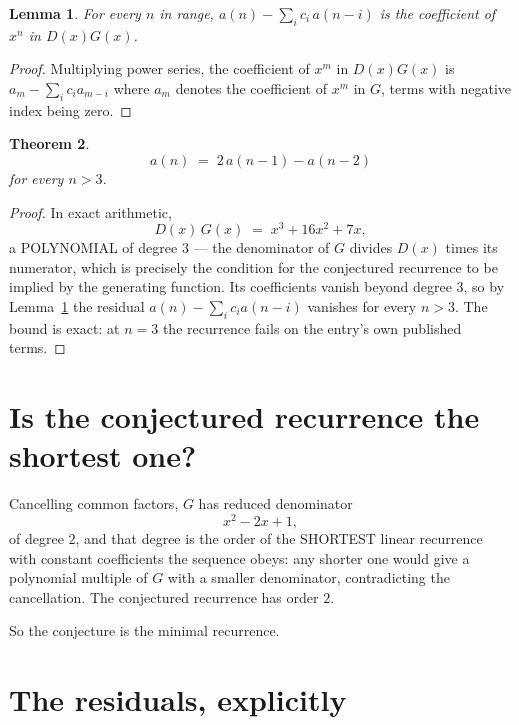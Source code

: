 \documentclass[11pt,a4paper]{article}
\theoremstyle{plain}
\newtheorem{theorem}{Theorem}
\newtheorem{lemma}[theorem]{Lemma}
\theoremstyle{definition}
\begin{document}
\begin{lemma}\label{lem:key}
For every $n$ in range, $a(n)-\sum_i c_i\,a(n-i)$ is the coefficient of $x^{n}$ in
$D(x)G(x)$.
\end{lemma}

\begin{proof}
Multiplying power series, the coefficient of $x^{m}$ in $D(x)G(x)$ is
$a_m-\sum_i c_i a_{m-i}$ where $a_m$ denotes the coefficient of $x^{m}$ in $G$, terms with
negative index being zero.
\end{proof}

\begin{theorem}
\[
a(n)\;=\;2\,a(n-1) - a(n-2)
\]
for every $n>3$.
\end{theorem}

\begin{proof}
In exact arithmetic,
\[
D(x)\,G(x)\;=\;x^{3} + 16 x^{2} + 7 x,
\]
a POLYNOMIAL of degree $3$ --- the denominator of $G$ divides $D(x)$ times its numerator,
which is precisely the condition for the conjectured recurrence to be implied by the
generating function. Its coefficients vanish beyond degree $3$, so by
Lemma~\ref{lem:key} the residual $a(n)-\sum_ic_ia(n-i)$ vanishes for every
$n>3$. The bound is exact: at $n=3$ the recurrence fails on the entry's own published terms.
\end{proof}

\section{Is the conjectured recurrence the shortest one?}

Cancelling common factors, $G$ has reduced denominator
\[
x^{2} - 2 x + 1,
\]
of degree $2$, and that degree is the order of the SHORTEST linear recurrence with
constant coefficients the sequence obeys: any shorter one would give a polynomial multiple of
$G$ with a smaller denominator, contradicting the cancellation. The conjectured recurrence has
order $2$.

So the conjecture is the minimal recurrence.

\section{The residuals, explicitly}
\end{document}
